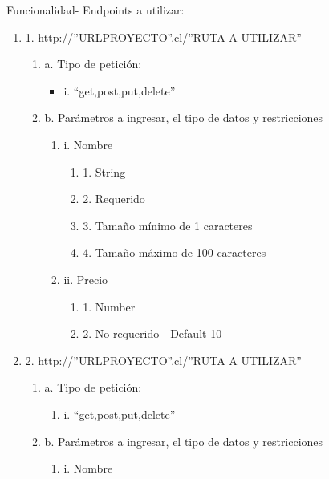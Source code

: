 Funcionalidad- Endpoints a utilizar:
\begin{enumerate}
    \item 1. http://”URLPROYECTO”.cl/”RUTA A UTILIZAR”
    \begin{enumerate}
        \item a. Tipo de petición:
            \begin{itemize}
               \item i. “get,post,put,delete”
            \end{itemize}
        \item b. Parámetros a ingresar, el tipo de datos y restricciones
            \begin{enumerate}
                \item i. Nombre
                    \begin{enumerate}
                        \item 1. String
                        \item 2. Requerido
                        \item 3. Tamaño mínimo de 1 caracteres
                        \item 4. Tamaño máximo de 100 caracteres
                    \end{enumerate}
                \item  ii. Precio
                    \begin{enumerate}
                        \item 1. Number
                        \item 2. No requerido - Default 10
                    \end{enumerate}
            \end{enumerate}
    \end{enumerate}
    \item 2. http://”URLPROYECTO”.cl/”RUTA A UTILIZAR”
        \begin{enumerate}
            \item a. Tipo de petición:
                \begin{enumerate}
                    \item i. “get,post,put,delete”
                \end{enumerate}
            \item b. Parámetros a ingresar, el tipo de datos y restricciones
        \begin{enumerate}
            \item i. Nombre
                \begin{enumerate}

\end{enumerate}
\end{enumerate}
\end{enumerate}
\end{enumerate}
